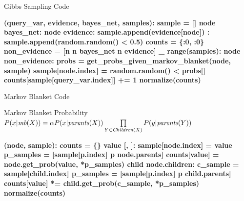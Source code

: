 \documentclass[14pt]{beamer}
\begin{document}
\begin{frame}[fragile]{Gibbs Sampling Code}
	\vspace{-.5em}
	\begin{semiverbatim}\scriptsize\bfseries
		 (query_var, evidence, bayes_net, samples):
		    \pause{}
		    sample = []
		     node  bayes_net:
		         node  evidence:
		            sample.append(evidence[node])
		        :
		            sample.append(random.random() < \num{0.5})
		    \pause{}
		    counts = \{:\num{0}, :\num{0}\}
		    non_evidence = [n  n  bayes_net  n  evidence]
		     _  range(samples):
		         node  non_evidence:
		            \pause{}
		            probs = get_probs_given_markov_blanket(node, sample)
		            \pause{}
		            sample[node.index] = random.random() < probs[]
		            \pause{}
		            counts[sample[query_var.index]] += \num{1}
		    \pause{}
		     normalize(counts)
	\end{semiverbatim}
\end{frame}
\begin{frame}[fragile]{Markov Blanket Code}
	\begin{block}{Markov Blanket Probability}
	\small 
	$P(x|\textit{mb}(X)) = \alpha P(x|\textit{parents}(X)) \prod\limits_{Y \in \textit{\scriptsize Children}(X)}P(y|\textit{parents}(Y))$
	\vspace{-.25em}
	\end{block}
	\vspace{.25em}
	\pause
	\begin{semiverbatim}\scriptsize\bfseries
		 (node, sample):
		    \pause{}
		    counts = \{\}
		     value  [, ]:
		        \pause{}
		        sample[node.index] = value
		        \pause{}
		        p_samples = [sample[p.index]  p  node.parents]
		        counts[value] = node.get_prob(value, *p_samples)
		        \pause{}
		         child  node.children:
		            c_sample = sample[child.index]
		            p_samples = [sample[p.index]  p  child.parents]
		            counts[value] *= child.get_prob(c_sample, *p_samples)
		    \pause{} normalize(counts)
	\end{semiverbatim}
\end{frame}
\end{document}
